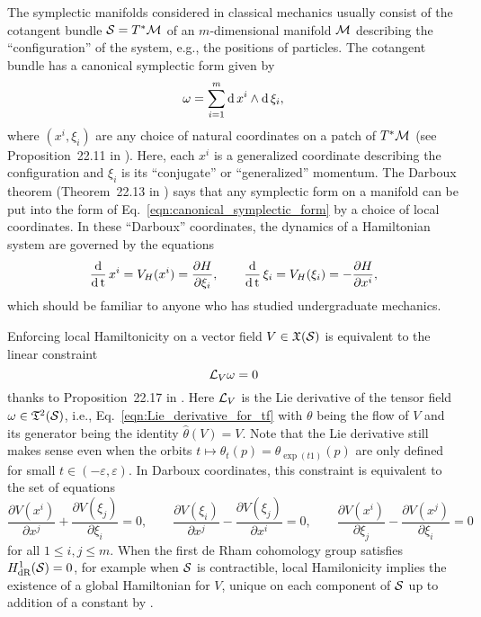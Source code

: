 \documentclass[twoside,11pt]{article}
\begin{document}
The symplectic manifolds considered in classical mechanics usually consist of the cotangent bundle ${\mathcal{S}} = T^* {\mathcal{M}}$ of an $m$-dimensional manifold ${\mathcal{M}}$ describing the ``configuration'' of the system, e.g., the positions of particles.
The cotangent bundle has a canonical symplectic form given by
\begin{equation}
    \omega = \sum_{i=1}^{m} \operatorname{\mathrm{d}} x^i \wedge \operatorname{\mathrm{d}} \xi_i,
    \label{eqn:canonical_symplectic_form}
\end{equation}
where $(x^i, \xi_i)$ are any choice of natural coordinates on a patch of $T^* {\mathcal{M}}$ (see Proposition~22.11 in \cite{Lee2013introduction}).
Here, each $x^i$ is a generalized coordinate describing the configuration and $\xi_i$ is its ``conjugate'' or ``generalized'' momentum.
The Darboux theorem (Theorem~22.13 in \cite{Lee2013introduction}) says that any symplectic form on a manifold can be put into the form of Eq.~\ref{eqn:canonical_symplectic_form} by a choice of local coordinates.
In these ``Darboux'' coordinates, the dynamics of a Hamiltonian system are governed by the equations
\begin{equation}
    \operatorname{\frac{\operatorname{\mathrm{d}}}{\operatorname{\mathrm{d}} t}} x^i = V_H(x^i) = \frac{\partial H}{\partial \xi_i}, 
    \qquad
    \operatorname{\frac{\operatorname{\mathrm{d}}}{\operatorname{\mathrm{d}} t}} \xi_i = V_H(\xi_i) = - \frac{\partial H}{\partial x^i},
\end{equation}
which should be familiar to anyone who has studied undergraduate mechanics.

Enforcing local Hamiltonicity on a vector field $V\in\mathfrak{X}({\mathcal{S}})$ is equivalent to the linear constraint
\begin{equation}
    {\mathcal{L}}_V \omega 
    = 0
\end{equation}
thanks to Proposition~22.17 in \cite{Lee2013introduction}. 
Here ${\mathcal{L}}_V$ is the Lie derivative of the tensor field $\omega \in \mathfrak{T}^2({\mathcal{S}})$, i.e., Eq.~\ref{eqn:Lie_derivative_for_tf} with $\theta$ being the flow of $V$ and its generator being the identity $\hat{\theta}(V) = V$.
Note that the Lie derivative still makes sense even when the orbits $t \mapsto \theta_t(p) = \theta_{\exp(t 1)}(p)$ are only defined for small $t\in (-\varepsilon, \varepsilon)$.
In Darboux coordinates, this constraint is equivalent to the set of equations
\begin{equation}
    \frac{\partial V(x^i)}{\partial x^j} + \frac{\partial V(\xi_j)}{\partial \xi_i} = 0, \qquad
    \frac{\partial V(\xi_i)}{\partial x^j} - \frac{\partial V(\xi_j)}{\partial x^i} = 0, \qquad
    \frac{\partial V(x^i)}{\partial \xi_j} - \frac{\partial V(x^j)}{\partial \xi_i} = 0
\end{equation}
for all $1\leq i,j \leq m$.
When the first de Rham cohomology group satisfies $H^1_{\text{dR}}({\mathcal{S}}) = 0$, for example when ${\mathcal{S}}$ is contractible, local Hamilonicity implies the existence of a global Hamiltonian for $V$, unique on each component of ${\mathcal{S}}$ up to addition of a constant by \citet[Proposition~22.17]{Lee2013introduction}.
\end{document}

